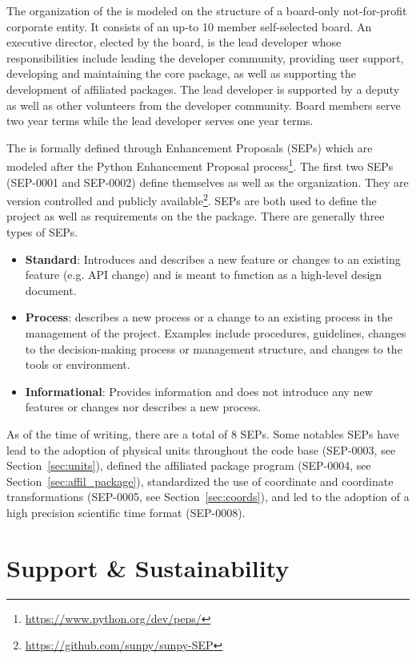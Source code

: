The organization of the \sunpyproj is modeled on the structure of a board-only not-for-profit corporate entity. 
It consists of an up-to 10 member self-selected board. 
An executive director, elected by the board, is the lead developer whose responsibilities include leading the developer community, providing user support, developing and maintaining the core package, as well as supporting the development of affiliated packages. 
The lead developer is supported by a deputy as well as other volunteers from the developer community. 
Board members serve two year terms while the lead developer serves one year terms. 

The \sunpyproj is formally defined through \sunpy Enhancement Proposals (SEPs) which are modeled after the Python Enhancement Proposal process\footnote{\url{https://www.python.org/dev/peps/}}. 
The first two SEPs (SEP-0001 and SEP-0002) define themselves as well as the \sunpy organization. 
They are version controlled and publicly available\footnote{\url{https://github.com/sunpy/sunpy-SEP}}. 
SEPs are both used to define the project as well as requirements on the the \sunpypkg package. 
There are generally three types of SEPs. 
\begin{itemize}
    \item \textbf{Standard}: Introduces and describes a new feature or changes to an existing feature (e.g. API change) and is meant to function as a high-level design document.
    \item \textbf{Process}: describes a new process or a change to an existing process in the management of the project. Examples include procedures, guidelines, changes to the decision-making process or management structure, and changes to the tools or environment.
    \item \textbf{Informational}: Provides information and does not introduce any new features or changes nor describes a new process.
\end{itemize}

As of the time of writing, there are a total of 8 SEPs. 
Some notables SEPs have lead to the adoption of physical units throughout the code base (SEP-0003, see Section~\ref{sec:units}), defined the affiliated package program (SEP-0004, see Section~\ref{sec:affil_package}), standardized the use of coordinate and coordinate transformations (SEP-0005, see Section~\ref{sec:coords}), and led to the adoption of a high precision scientific time format (SEP-0008).

\section{Support \& Sustainability}


